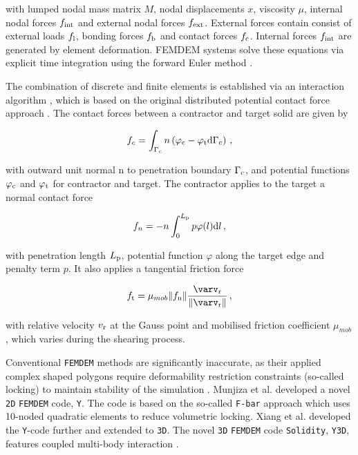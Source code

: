 \documentclass[format=acmtog, 12pt, screen=true, review=false]{acmart}
\begin{document}
with lumped nodal mass matrix $M$, nodal displacements $x$, viscosity $\mu$, internal nodal forces $f_{\rm{int}}$ and external nodal forces $f_{\rm{ext}}$. External forces contain consist of external loads $f_{\rm{l}}$, bonding forces $f_{\rm{b}}$ and contact forces $f_{\rm{c}}$. Internal forces $f_{\rm{int}}$ are generated by element deformation. FEMDEM systems solve these equations via explicit
time integration using the forward Euler method \cite{Lei16}.

\bigbreak
The combination of discrete and finite elements is established via an interaction algorithm \cite{Lei16}, which is based on the original distributed potential contact force approach \cite{Mun13}. The contact forces between a contractor and target solid are given by

\begin{equation}
    f_c=\int_{\Gamma_{\rm{c}}}n\left(\varphi_{\rm{c}}-\varphi_{\rm{t}}\rm{d}\Gamma_{\rm{c}}\right)\,,
\end{equation}

with outward unit normal n to penetration boundary $\Gamma_{\rm{c}}$, and potential functions $\varphi_{\rm{c}}$ and $\varphi_{\rm{t}}$ for contractor and target. The contractor applies to the target a normal contact force

\begin{equation}
    f_n=-n\int_0^{L_{\rm{p}}} p\varphi(l){\rm{d}}l\,,
\end{equation}

with penetration length $L_{\rm{p}}$, potential function $\varphi$ along the target edge and penalty term $p$. It also applies a tangential friction force 

\begin{equation}
    f_{\rm{t}}=\mu_{mob}\lVert f_{\rm{n}} \rVert\frac{\varv_{\rm{r}}}{\lVert \varv_{\rm{r}}\rVert}\,,
\end{equation}

with relative velocity $v_{\rm{r}}$ at the Gauss point and mobilised friction coefficient $\mu_{mob}$, which varies during the shearing process.

\bigbreak
Conventional \texttt{FEMDEM} methods are significantly inaccurate, as their applied complex shaped polygons require deformability restriction constraints (so-called locking) to maintain stability of the simulation \cite{Lat15}. Munjiza et al. \cite{Mun13} developed a novel \texttt{2D} \texttt{FEMDEM} code, \texttt{Y}. The code is based on the so-called \texttt{F-bar} approach which uses 10-noded quadratic elements to reduce volumetric locking. Xiang et al. \cite{Xia09} developed the \texttt{Y}-code further and extended to \texttt{3D}. The novel \texttt{3D} \texttt{FEMDEM} code \texttt{Solidity}, \texttt{Y3D}, features coupled multi-body interaction \cite{Lat15}.
\end{document}
